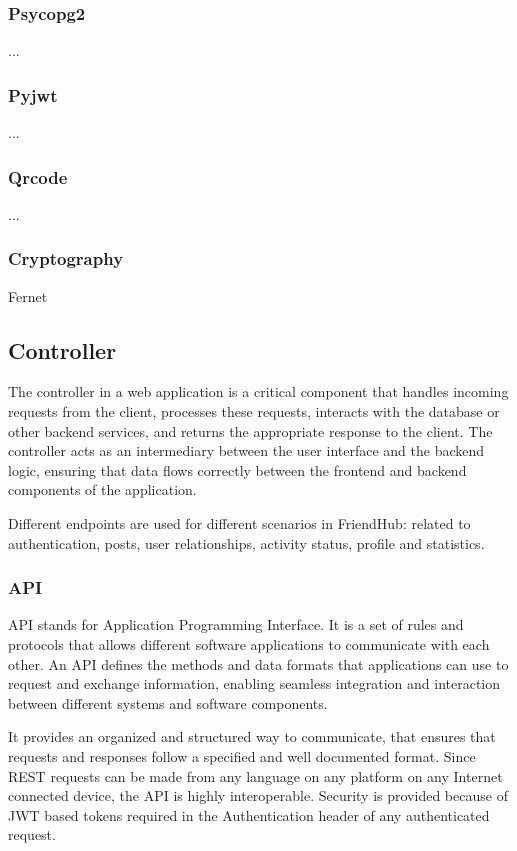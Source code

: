     \subsubsection{Psycopg2}
    ...
    \subsubsection{Pyjwt}
    ...
    \subsubsection{Qrcode}
    ...
    \subsubsection{Cryptography}
    Fernet

    \subsection{Controller}
    The controller in a web application is a critical component that handles incoming requests from the client, processes these requests, interacts with the database or other backend services, and returns the appropriate response to the client. The controller acts as an intermediary between the user interface and the backend logic, ensuring that data flows correctly between the frontend and backend components of the application.


    Different endpoints are used for different scenarios in FriendHub: related to authentication, posts, user relationships, activity status, profile and statistics.

    \subsubsection{API}
    API stands for Application Programming Interface. It is a set of rules and protocols that allows different software applications to communicate with each other. An API defines the methods and data formats that applications can use to request and exchange information, enabling seamless integration and interaction between different systems and software components.

    It provides an organized and structured way to communicate, that ensures that requests and responses follow a specified and well documented format. Since REST requests can be made from any language on any platform on any Internet connected device, the API is highly interoperable. Security is provided because of JWT based tokens required in the Authentication header of any authenticated request.

